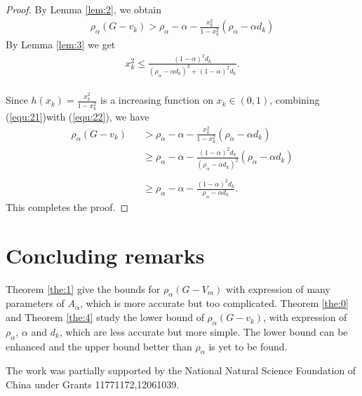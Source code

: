 \documentclass[amsthm]{elsart}
\begin{document}
\begin{proof}
By Lemma \ref {lem:2}, we obtain \\
\begin{eqnarray} \label{equ:21}
\rho _\alpha (G - v_k)
    > \rho _\alpha - \alpha - \frac{x_k^2}{1 - x_k^2} (\rho _\alpha - \alpha d_k)
\end{eqnarray}
By Lemma \ref {lem:3} we get
\begin{eqnarray} \label{equ:22}
x_k^2 \leqslant \frac{(1 - \alpha)^2 d_k}{(\rho _\alpha - \alpha d_k)^2 + (1 - \alpha)^2 d_k}.
\end{eqnarray}
\\
Since $h(x_k) = \frac{x_k^2}{1 - x_k^2} $ is a increasing function on $x_k \in (0, 1)$, combining (\ref{equ:21})with (\ref{equ:22}), we have  \\
\begin{eqnarray*}
\rho _\alpha (G - v_k)
  &&> \rho _\alpha - \alpha - \frac{x_k^2}{1 - x_k^2} (\rho _\alpha - \alpha d_k)
  \\ &&\geqslant \rho _\alpha - \alpha - \frac{(1 - \alpha)^2 d_k}{(\rho _\alpha - \alpha d_k)^2} (\rho _\alpha - \alpha d_k)  \\
  \\ &&\geqslant \rho _\alpha - \alpha - \frac{(1 - \alpha)^2 d_k}{\rho _\alpha - \alpha d_k}
.
\end{eqnarray*}
This completes the proof.
\end{proof}

\section{Concluding remarks}

Theorem \ref{the:1} give the bounds for $\rho_\alpha(G-V_m)$ with expression of many parameters of $A_\alpha$, which is more accurate but too complicated.
Theorem \ref{the:0} and Theorem \ref{the:4} study the lower bound of $\rho_\alpha(G-v_k)$, with expression of $\rho_\alpha$, $\alpha$ and $d_k$, which are less accurate but more simple.
The lower bound can be enhanced and the upper bound better than $\rho_\alpha$ is yet to be found.

\vskip4mm


 The work was partially supported by the National Natural Science Foundation of China under Grants 11771172,12061039.
\end{document}
